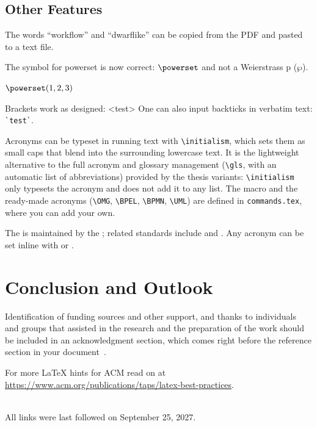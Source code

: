 \subsection{Other Features}

\begin{ltgexample}
The words \enquote{workflow} and \enquote{dwarflike} can be copied from the PDF and pasted to a text file.
\end{ltgexample}

\begin{ltgexample}
The symbol for powerset is now correct: $\powerset$ and not a Weierstrass p ($\wp$).

$\powerset({1,2,3})$
\end{ltgexample}

\begin{ltgexample}
Brackets work as designed:
<test>
One can also input backticks in verbatim text: \verb|`test`|.
\end{ltgexample}

Acronyms can be typeset in running text with \verb+\initialism+, which sets them as small caps that blend into the surrounding lowercase text. It is the lightweight alternative to the full acronym and glossary management (\verb+\gls+, with an automatic list of abbreviations) provided by the thesis variants: \verb+\initialism+ only typesets the acronym and does not add it to any list. The macro and the ready-made acronyms (\verb+\OMG+, \verb+\BPEL+, \verb+\BPMN+, \verb+\UML+) are defined in \texttt{commands.tex}, where you can add your own.

\begin{ltgexample}
The \UML is maintained by the \OMG; related standards include \BPEL and \BPMN.
Any acronym can be set inline with  or .
\end{ltgexample}


\section{Conclusion and Outlook}
\label{sec:outlook}
\lipsum[1-2]

\begin{acks}
  Identification of funding sources and other support, and thanks to individuals and groups that assisted in the research and the preparation of the work should be included in an acknowledgment section, which comes right before the reference section in your document~\cite{acmart}.

  For more \LaTeX{} hints for ACM read on at \url{https://www.acm.org/publications/taps/latex-best-practices}.
\end{acks}





\ \\
%
\noindent
All links were last followed on September 25, 2027.


